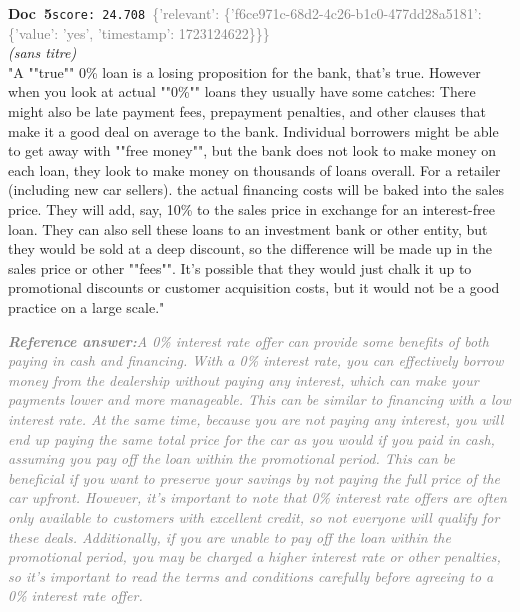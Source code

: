 \documentclass[a4paper,11pt]{article}
\begin{document}
\begin{docenv}
{\footnotesize\textcolor{doccolor}{\textbf{Doc~5}}}\hfill{\tiny\texttt{score:~24.708}}\ {\tiny\textcolor{gray}{\{'relevant': \{'f6ce971c-68d2-4c26-b1c0-477dd28a5181': \{'value': 'yes', 'timestamp': 1723124622\}\}\}}}\\[3pt]
{\small\textit{(sans titre)}}\\[2pt]
\vspace{2pt}
{\footnotesize 
"A ""true"" 0\% loan is a losing proposition for the bank, that's true.  However when you look at actual ""0\%"" loans they usually have some catches: There might also be late payment fees, prepayment penalties, and other clauses that make it a good deal on average to the bank.  Individual borrowers might be able to get away with ""free money"", but the bank does not look to make money on each loan, they look to make money on thousands of loans overall. For a retailer (including new car sellers). the actual financing costs will be baked into the sales price.  They will add, say, 10\% to the sales price in exchange for an interest-free loan. They can also sell these loans to an investment bank or other entity, but they would be sold at a deep discount, so the difference will be made up in the sales price or other ""fees"". It's possible that they would just chalk it up to promotional discounts or customer acquisition costs, but it would not be a good practice on a large scale."}
\end{docenv}
\begin{refanswerenv}
{\footnotesize\textit{\textcolor{gray}{\textbf{Reference answer:}\enspace A 0\% interest rate offer can provide some benefits of both paying in cash and financing. With a 0\% interest rate, you can effectively borrow money from the dealership without paying any interest, which can make your payments lower and more manageable. This can be similar to financing with a low interest rate. At the same time, because you are not paying any interest, you will end up paying the same total price for the car as you would if you paid in cash, assuming you pay off the loan within the promotional period. This can be beneficial if you want to preserve your savings by not paying the full price of the car upfront. However, it's important to note that 0\% interest rate offers are often only available to customers with excellent credit, so not everyone will qualify for these deals. Additionally, if you are unable to pay off the loan within the promotional period, you may be charged a higher interest rate or other penalties, so it's important to read the terms and conditions carefully before agreeing to a 0\% interest rate offer.}}}
\end{refanswerenv}
\end{document}
